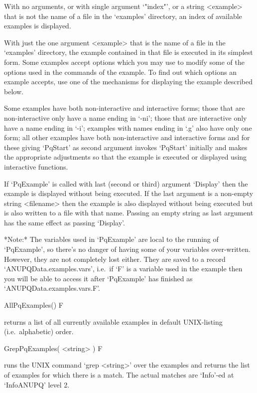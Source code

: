 With no arguments,  or  with  single  argument  `"index"',  or  a  string
<example> that is not the name of a file in the `examples' directory,  an
index of available examples is displayed.

With just the one argument <example> that is the name of a  file  in  the
`examples' directory, the example contained in that file is  executed  in
its simplest form. Some examples accept options  which  you  may  use  to
modify some of the options used in the commands of the example.  To  find
out which options an example accepts,  use  one  of  the  mechanisms  for
displaying the example described below.

Some examples have both non-interactive and interactive forms; those that
are non-interactive only have a name ending  in  `-ni';  those  that  are
interactive only have a name ending in `-i'; examples with  names  ending
in  `.g'  also  have  only  one  form;  all  other  examples  have   both
non-interactive and interactive forms and for these giving  `PqStart'  as
second argument invokes `PqStart' initially  and  makes  the  appropriate
adjustments  so  that  the  example  is  executed  or   displayed   using
interactive functions.

If `PqExample' is called with last (second or third)  argument  `Display'
then the example  is  displayed  without  being  executed.  If  the  last
argument is a non-empty  string  <filename>  then  the  example  is  also
displayed without being executed but is also written to a file with  that
name. Passing an empty string as last argument has  the  same  effect  as
passing `Display'.

*Note:*
The  variables  used  in  `PqExample'  are  local  to  the   running   of
`PqExample', so there's no  danger  of  having  some  of  your  variables
over-written. However, they are not  completely  lost  either.  They  are
saved to a record `ANUPQData.examples.vars', i.e.~if `F'  is  a  variable
used in the example then you will be able to access it after  `PqExample'
has finished as `ANUPQData.examples.vars.F'.

\>AllPqExamples() F

returns  a  list  of  all  currently  available   examples   in   default
UNIX-listing (i.e.~alphabetic) order.

\>GrepPqExamples( <string> ) F

runs the UNIX command `grep <string>'  over  the  {\ANUPQ}  examples  and
returns the list of examples for which  there  is  a  match.  The  actual
matches are `Info'-ed at `InfoANUPQ' level 2.

